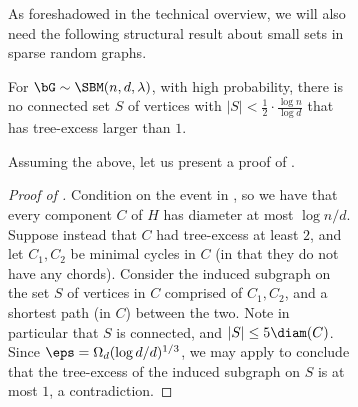 \documentclass[11pt,letterpaper]{article}
\begin{document}
\begin{figure}
\begin{figure}
As foreshadowed in the technical overview, we will also need the following structural result about small sets in sparse random graphs.
\begin{lemma}
    \label{lem:small-subgraphs-have-excess-1}
    For $\bG\sim\SBM(n,d,\lambda)$, with high probability, there is no connected set $S$ of vertices with $|S| < \frac{1}{2} \cdot \frac{\log n}{\log d}$ that has tree-excess larger than $1$.
\end{lemma}
Assuming the above, let us present a proof of .

\begin{proof}[Proof of ]
    Condition on the event in , so we have that every component $C$ of $H$ has diameter at most $\log n/d$. Suppose instead that $C$ had tree-excess at least $2$, and let $C_1,C_2$ be minimal cycles in $C$ (in that they do not have any chords). Consider the induced subgraph on the set $S$ of vertices in $C$ comprised of $C_1,C_2$, and a shortest path (in $C$) between the two. Note in particular that $S$ is connected, and $|S| \le 5 \diam(C)$. Since $\eps = \Omega_d(\log d/d)^{1/3}$, we may apply  to conclude that the tree-excess of the induced subgraph on $S$ is at most $1$, a contradiction.
\end{proof}


\end{figure}
\end{figure}
\end{document}

